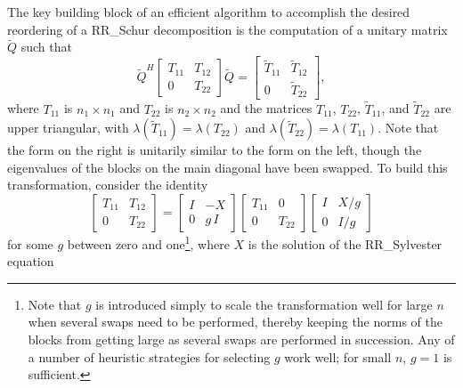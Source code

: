 The key building block of an efficient algorithm to accomplish the desired reordering of a RR_Schur decomposition is the computation of a unitary matrix $\tilde Q$ such that
\begin{equation}
  \tilde Q^H \begin{bmatrix} T_{11} & T_{12} \\  0 & T_{22} \end{bmatrix} \tilde Q = \begin{bmatrix} \tilde T_{11} & \tilde T_{12} \\  0 & \tilde T_{22} \end{bmatrix},
  \label{blockswap}
\end{equation}
where $T_{11}$ is $n_1 \times n_1$ and $T_{22}$ is $n_2 \times n_2$ and the matrices $T_{11}$, $T_{22}$, $\tilde T_{11}$, and $\tilde T_{22}$ are upper triangular,
with $\lambda(\tilde T_{11})=\lambda(T_{22})$ and $\lambda(\tilde T_{22})=\lambda(T_{11})$.  
Note that the form on the right is unitarily similar to the form on
the left, though the eigenvalues of the blocks on the main diagonal have been swapped.
To build this transformation, consider the identity
\begin{equation}
  \begin{bmatrix} T_{11} & T_{12} \\ 0 & T_{22} \end{bmatrix} =
  \begin{bmatrix} I & -X \\ 0 & g\, I \end{bmatrix} \begin{bmatrix} T_{11} & 0 \\ 0 & T_{22} \end{bmatrix} \begin{bmatrix} I & X/g \\ 0 & I/g \end{bmatrix}
    \label{blockswap2}  
\end{equation}
for some $g$ between zero and one\footnote{Note that $g$ is introduced simply to scale the transformation well for large $n$ when several swaps need
to be performed, thereby keeping the norms
of the blocks from getting large as several swaps are performed in succession.  Any of a number of heuristic strategies for selecting $g$ work well;
for small $n$, $g=1$ is sufficient.}, where $X$ is the solution of the RR_Sylvester equation

